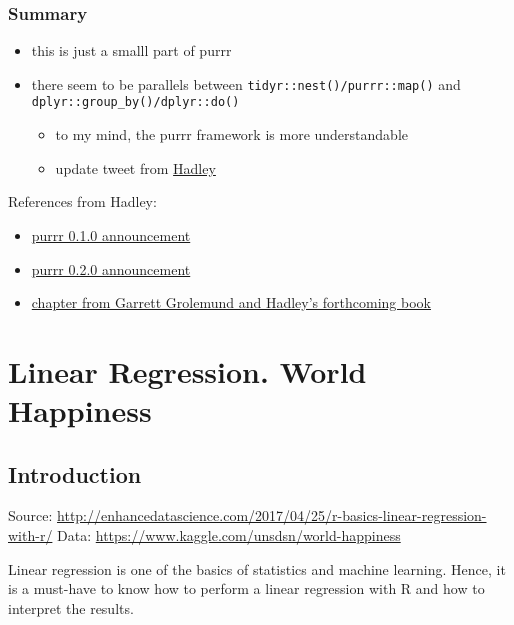\documentclass[]{book}
\providecommand{\tightlist}{%
  \setlength{\itemsep}{0pt}\setlength{\parskip}{0pt}}
\begin{document}
\hypertarget{summary}{%
\subsection{Summary}\label{summary}}

\begin{itemize}
\tightlist
\item
  this is just a smalll part of purrr
\item
  there seem to be parallels between \texttt{tidyr::nest()/purrr::map()} and \texttt{dplyr::group\_by()/dplyr::do()}

  \begin{itemize}
  \tightlist
  \item
    to my mind, the purrr framework is more understandable
  \item
    update tweet from \href{https://twitter.com/hadleywickham/status/719542847045636096}{Hadley}
  \end{itemize}
\end{itemize}

References from Hadley:

\begin{itemize}
\tightlist
\item
  \href{http://blog.rstudio.org/2015/09/29/purrr-0-1-0/}{purrr 0.1.0 announcement}
\item
  \href{http://blog.rstudio.org/2016/01/06/purrr-0-2-0/}{purrr 0.2.0 announcement}
\item
  \href{http://r4ds.had.co.nz/iteration.html}{chapter from Garrett Grolemund and Hadley's forthcoming book}
\end{itemize}

\hypertarget{linear-regression.-world-happiness}{%
\chapter{Linear Regression. World Happiness}\label{linear-regression.-world-happiness}}

\hypertarget{introduction}{%
\section{Introduction}\label{introduction}}

Source: \url{http://enhancedatascience.com/2017/04/25/r-basics-linear-regression-with-r/}
Data: \url{https://www.kaggle.com/unsdsn/world-happiness}

Linear regression is one of the basics of statistics and machine learning. Hence, it is a must-have to know how to perform a linear regression with R and how to interpret the results.
\end{document}
